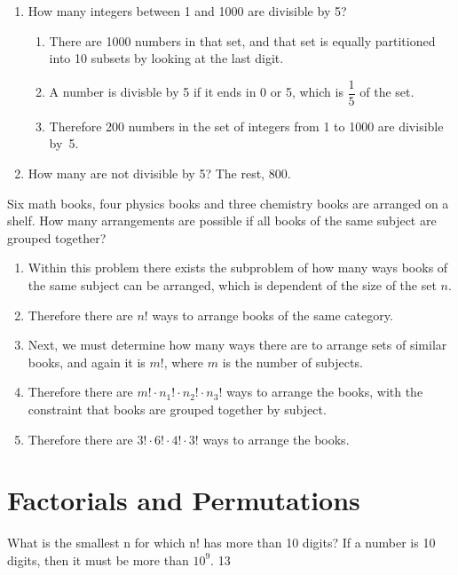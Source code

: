 \documentclass[openany, 11pt]{book}
\begin{document}
\begin{exercise}{}{}
	\begin{enumerate}[label = {(\arabic*)}]
		\item How many integers between 1 and 1000 are divisible by 5?
		      \begin{enumerate}[label={}, leftmargin=*, itemsep=0pt, parsep=0pt]
			      \item There are 1000 numbers in that set, and that set is equally partitioned
			            into 10 subsets by looking at the last digit.
			      \item A number is divisble by 5 if it ends in 0 or 5, which is $\dfrac{1}{5}$ of
			            the set.
			      \item Therefore 200 numbers in the set of integers from 1 to 1000 are divisible
			            \mbox{by 5}.
		      \end{enumerate}
		\item How many are not divisible by 5?
		      The rest, 800.
	\end{enumerate}
\end{exercise}

\begin{exercise}{}{}
	Six math books, four physics books and three chemistry books are
	arranged on a shelf. How many arrangements are possible if all books of the
	same subject are grouped together?
	\begin{enumerate}[label={\textbullet}, leftmargin=*, itemsep=0pt, parsep=0pt]
		\item Within this problem there exists the subproblem of how many ways books of
		      the same subject can be arranged, which is dependent of the size of the set
		      $n$.
		\item Therefore there are $n!$ ways to arrange books of the same category.
		\item Next, we must determine how many ways there are to arrange sets of similar
		      books, and again it is $m!$, where $m$ is the number of subjects.
		\item Therefore there are $m! \cdot n_1! \cdot n_2! \cdot n_3!$ ways to arrange the
		      books, with the constraint that books are grouped together by subject.
		\item Therefore there are $3! \cdot 6! \cdot 4! \cdot 3!$ ways to arrange the
		      books.
	\end{enumerate}
\end{exercise}

\section{Factorials and Permutations}
\begin{exercise}{}{}
	What is the smallest n for which n! has more than 10 digits?
	If a number is 10 digits, then it must be more than $10^{9}$. 13
\end{exercise}
\end{document}
